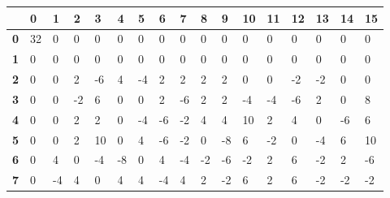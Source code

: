 \begin{longtable}[c]{|l|l|l|l|l|l|l|l|l|l|l|l|l|l|l|l|l|}
\hline
            & \textbf{0} & \textbf{1} & \textbf{2} & \textbf{3} & \textbf{4} & \textbf{5} & \textbf{6} & \textbf{7} & \textbf{8} & \textbf{9} & \textbf{10} & \textbf{11} & \textbf{12} & \textbf{13} & \textbf{14} & \textbf{15} \\ \hline
\endfirsthead
%
\endhead
%
\textbf{0}  & 32         & 0          & 0          & 0          & 0          & 0          & 0          & 0          & 0          & 0          & 0           & 0           & 0           & 0           & 0           & 0           \\ \hline
\textbf{1}  & 0          & 0          & 0          & 0          & 0          & 0          & 0          & 0          & 0          & 0          & 0           & 0           & 0           & 0           & 0           & 0           \\ \hline
\textbf{2}  & 0          & 0          & 2          & -6         & 4          & -4         & 2          & 2          & 2          & 2          & 0           & 0           & -2          & -2          & 0           & 0           \\ \hline
\textbf{3}  & 0          & 0          & -2         & 6          & 0          & 0          & 2          & -6         & 2          & 2          & -4          & -4          & -6          & 2           & 0           & 8           \\ \hline
\textbf{4}  & 0          & 0          & 2          & 2          & 0          & -4         & -6         & -2         & 4          & 4          & 10          & 2           & 4           & 0           & -6          & 6           \\ \hline
\textbf{5}  & 0          & 0          & 2          & 10         & 0          & 4          & -6         & -2         & 0          & -8         & 6           & -2          & 0           & -4          & 6           & 10          \\ \hline
\textbf{6}  & 0          & 4          & 0          & -4         & -8         & 0          & 4          & -4         & -2         & -6         & -2          & 2           & 6           & -2          & 2           & -6          \\ \hline
\textbf{7}  & 0          & -4         & 4          & 0          & 4          & 4          & -4         & 4          & 2          & -2         & 6           & 2           & 6           & -2          & -2          & -2          \\ \hline

\end{longtable}
